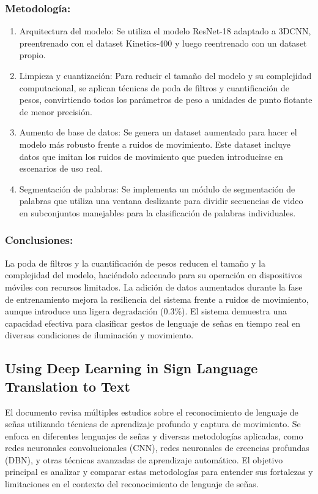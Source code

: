 \subsubsection {Metodología: }
	\begin{enumerate}
		\item {Arquitectura del modelo: }
		 Se utiliza el modelo ResNet-18 adaptado a 3DCNN, preentrenado con el dataset Kinetics-400 y luego reentrenado con un dataset propio.
		\item {Limpieza y cuantización: }
		Para reducir el tamaño del modelo y su complejidad computacional, se aplican técnicas de poda de filtros y cuantificación de pesos, convirtiendo todos los parámetros de peso a unidades de punto flotante de menor precisión.
		\item {Aumento de base de datos: }
		Se genera un dataset aumentado para hacer el modelo más robusto frente a ruidos de movimiento. Este dataset incluye datos que imitan los ruidos de movimiento que pueden introducirse en escenarios de uso real.
		\item {Segmentación de palabras: }
		Se implementa un módulo de segmentación de palabras que utiliza una ventana deslizante para dividir secuencias de video en subconjuntos manejables para la clasificación de palabras individuales.
	\end{enumerate}
\subsubsection {Conclusiones: }
La poda de filtros y la cuantificación de pesos reducen el tamaño y la complejidad del modelo, haciéndolo adecuado para su operación en dispositivos móviles con recursos limitados. La adición de datos aumentados durante la fase de entrenamiento mejora la resiliencia del sistema frente a ruidos de movimiento, aunque introduce una ligera degradación (0.3\%). El sistema demuestra una capacidad efectiva para clasificar gestos de lenguaje de señas en tiempo real en diversas condiciones de iluminación y movimiento.


\subsection{Using Deep Learning in Sign Language Translation to Text}
El documento revisa múltiples estudios sobre el reconocimiento de lenguaje de señas utilizando técnicas de aprendizaje profundo y captura de movimiento. Se enfoca en diferentes lenguajes de señas y diversas metodologías aplicadas, como redes neuronales convolucionales (CNN), redes neuronales de creencias profundas (DBN), y otras técnicas avanzadas de aprendizaje automático. El objetivo principal es analizar y comparar estas metodologías para entender sus fortalezas y limitaciones en el contexto del reconocimiento de lenguaje de señas.
